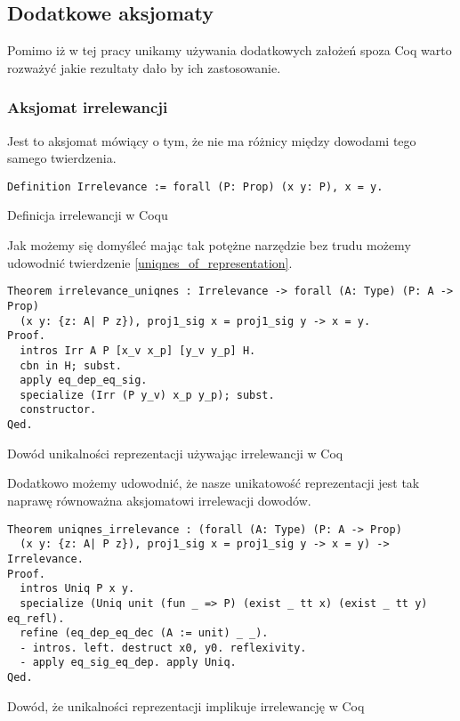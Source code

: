 \subsection{Dodatkowe aksjomaty}
Pomimo iż w tej pracy unikamy używania dodatkowych założeń spoza Coq warto rozważyć jakie rezultaty dało by ich zastosowanie. 
\subsubsection{Aksjomat irrelewancji}
Jest to aksjomat mówiący o tym, że nie ma różnicy między dowodami tego samego twierdzenia. 
\begin{code}
\begin{verbatim}
Definition Irrelevance := forall (P: Prop) (x y: P), x = y.
\end{verbatim}
\caption{Definicja irrelewancji w Coqu}
\label{uniqnes_of_representation}
\end{code}
Jak możemy się domyśleć mając tak potężne narzędzie bez trudu możemy udowodnić twierdzenie \ref{uniqnes_of_representation}. 
\begin{code}
\begin{verbatim}
Theorem irrelevance_uniqnes : Irrelevance -> forall (A: Type) (P: A -> Prop)
  (x y: {z: A| P z}), proj1_sig x = proj1_sig y -> x = y.
Proof.
  intros Irr A P [x_v x_p] [y_v y_p] H.
  cbn in H; subst.
  apply eq_dep_eq_sig.
  specialize (Irr (P y_v) x_p y_p); subst.
  constructor.
Qed.
\end{verbatim}
\caption{Dowód unikalności reprezentacji używając irrelewancji w Coq}
\end{code}
Dodatkowo możemy udowodnić, że nasze unikatowość reprezentacji jest tak naprawę równoważna aksjomatowi irrelewacji dowodów.
\begin{code}
\begin{verbatim}
Theorem uniqnes_irrelevance : (forall (A: Type) (P: A -> Prop)
  (x y: {z: A| P z}), proj1_sig x = proj1_sig y -> x = y) -> Irrelevance.
Proof.
  intros Uniq P x y.
  specialize (Uniq unit (fun _ => P) (exist _ tt x) (exist _ tt y) eq_refl). 
  refine (eq_dep_eq_dec (A := unit) _ _).
  - intros. left. destruct x0, y0. reflexivity.
  - apply eq_sig_eq_dep. apply Uniq.
Qed.
\end{verbatim}
\caption{Dowód, że unikalności reprezentacji implikuje irrelewancję w Coq}
\end{code}
